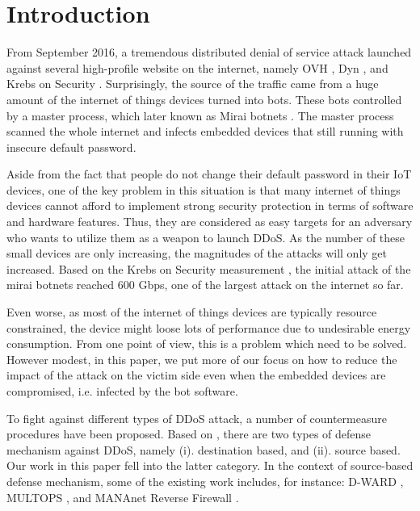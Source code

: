 \documentclass[sigplan,screen]{acmart}
\begin{document}

\maketitle

\section{Introduction}
From September 2016, a tremendous distributed denial of service attack launched against several high-profile website on the internet, namely OVH \cite{ovh}, Dyn \cite{dyn}, and Krebs on Security \cite{kos}. Surprisingly, the source of the traffic came from a huge amount of the internet of things devices turned into bots. These bots controlled by a master process, which later known as Mirai botnets \cite{203628}. The master process scanned the whole internet and infects embedded devices that still running with insecure default password. 

Aside from the fact that people do not change their default password in their IoT devices, one of the key problem in this situation is that many internet of things devices cannot afford to implement strong security protection in terms of software and hardware features. Thus, they are considered as easy targets for an adversary who wants to utilize them as a weapon to launch DDoS. As the number of these small devices are only increasing, the magnitudes of the attacks will only get increased. Based on the Krebs on Security measurement \cite{kos}, the initial attack of the mirai botnets reached 600 Gbps, one of the largest attack on the internet so far.

Even worse, as most of the internet of things devices are typically resource constrained, the device might loose lots of performance due to undesirable energy consumption. From one point of view, this is a problem which need to be solved. However modest, in this paper, we put more of our focus on how to reduce the impact of the attack on the victim side even when the embedded devices are compromised, i.e. infected by the bot software. 

To fight against different types of DDoS attack, a number of countermeasure procedures have been proposed. Based on \cite{6489876}, there are two types of defense mechanism against DDoS, namely (i). destination based, and (ii). source based. Our work in this paper fell into the latter category. In the context of source-based defense mechanism, some of the existing work includes, for instance: D-WARD \cite{1510618}, MULTOPS \cite{10.5555/1251327.1251330}, and MANAnet Reverse Firewall \cite{mananet}.
\end{document}
